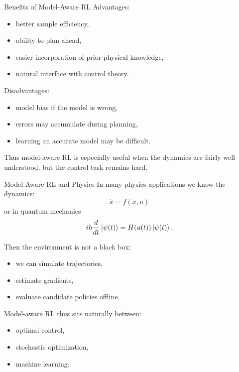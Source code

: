 \documentclass{beamer}
\begin{document}
\begin{frame}{Benefits of Model-Aware RL}
  Advantages:
  \begin{itemize}
  \item better sample efficiency,
  \item ability to plan ahead,
  \item easier incorporation of prior physical knowledge,
  \item natural interface with control theory.
  \end{itemize}

  Disadvantages:
  \begin{itemize}
  \item model bias if the model is wrong,
  \item errors may accumulate during planning,
  \item learning an accurate model may be difficult.
  \end{itemize}

  Thus model-aware RL is especially useful when the dynamics are fairly well understood, but the control task remains hard.
\end{frame}

\begin{frame}{Model-Aware RL and Physics}
  In many physics applications we know the dynamics:
  \[
  \dot x = f(x,u)
  \]
  or in quantum mechanics
  \[
  i\hbar \frac{d}{dt}\ket{\psi(t)}=H(u(t))\ket{\psi(t)}.
  \]

  Then the environment is not a black box:
  \begin{itemize}
  \item we can simulate trajectories,
  \item estimate gradients,
  \item evaluate candidate policies offline.
  \end{itemize}

  Model-aware RL thus sits naturally between:
  \begin{itemize}
  \item optimal control,
  \item stochastic optimization,
  \item machine learning.
  \end{itemize}
\end{frame}
\end{document}
